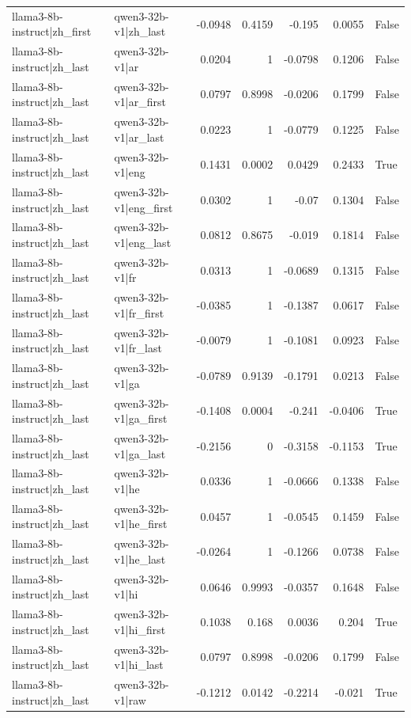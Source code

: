 \begin{table}
\begin{tabular}{l l r r r r l}
llama3-8b-instruct|zh_first & qwen3-32b-v1|zh_last & -0.0948 & 0.4159 & -0.195 & 0.0055 & False \\
llama3-8b-instruct|zh_last & qwen3-32b-v1|ar & 0.0204 & 1 & -0.0798 & 0.1206 & False \\
llama3-8b-instruct|zh_last & qwen3-32b-v1|ar_first & 0.0797 & 0.8998 & -0.0206 & 0.1799 & False \\
llama3-8b-instruct|zh_last & qwen3-32b-v1|ar_last & 0.0223 & 1 & -0.0779 & 0.1225 & False \\
llama3-8b-instruct|zh_last & qwen3-32b-v1|eng & 0.1431 & 0.0002 & 0.0429 & 0.2433 & True \\
llama3-8b-instruct|zh_last & qwen3-32b-v1|eng_first & 0.0302 & 1 & -0.07 & 0.1304 & False \\
llama3-8b-instruct|zh_last & qwen3-32b-v1|eng_last & 0.0812 & 0.8675 & -0.019 & 0.1814 & False \\
llama3-8b-instruct|zh_last & qwen3-32b-v1|fr & 0.0313 & 1 & -0.0689 & 0.1315 & False \\
llama3-8b-instruct|zh_last & qwen3-32b-v1|fr_first & -0.0385 & 1 & -0.1387 & 0.0617 & False \\
llama3-8b-instruct|zh_last & qwen3-32b-v1|fr_last & -0.0079 & 1 & -0.1081 & 0.0923 & False \\
llama3-8b-instruct|zh_last & qwen3-32b-v1|ga & -0.0789 & 0.9139 & -0.1791 & 0.0213 & False \\
llama3-8b-instruct|zh_last & qwen3-32b-v1|ga_first & -0.1408 & 0.0004 & -0.241 & -0.0406 & True \\
llama3-8b-instruct|zh_last & qwen3-32b-v1|ga_last & -0.2156 & 0 & -0.3158 & -0.1153 & True \\
llama3-8b-instruct|zh_last & qwen3-32b-v1|he & 0.0336 & 1 & -0.0666 & 0.1338 & False \\
llama3-8b-instruct|zh_last & qwen3-32b-v1|he_first & 0.0457 & 1 & -0.0545 & 0.1459 & False \\
llama3-8b-instruct|zh_last & qwen3-32b-v1|he_last & -0.0264 & 1 & -0.1266 & 0.0738 & False \\
llama3-8b-instruct|zh_last & qwen3-32b-v1|hi & 0.0646 & 0.9993 & -0.0357 & 0.1648 & False \\
llama3-8b-instruct|zh_last & qwen3-32b-v1|hi_first & 0.1038 & 0.168 & 0.0036 & 0.204 & True \\
llama3-8b-instruct|zh_last & qwen3-32b-v1|hi_last & 0.0797 & 0.8998 & -0.0206 & 0.1799 & False \\
llama3-8b-instruct|zh_last & qwen3-32b-v1|raw & -0.1212 & 0.0142 & -0.2214 & -0.021 & True \\

\end{tabular}
\end{table}

